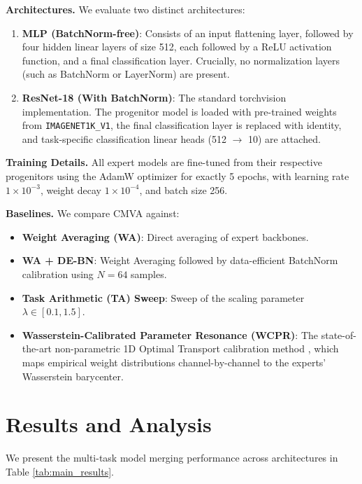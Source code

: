 \documentclass{article}
\theoremstyle{plain}
\theoremstyle{definition}
\theoremstyle{remark}
\begin{document}
\textbf{Architectures.} We evaluate two distinct architectures:
\begin{enumerate}
  \item \textbf{MLP (BatchNorm-free)}: Consists of an input flattening layer, followed by four hidden linear layers of size 512, each followed by a ReLU activation function, and a final classification layer. Crucially, no normalization layers (such as BatchNorm or LayerNorm) are present.
  \item \textbf{ResNet-18 (With BatchNorm)}: The standard torchvision implementation. The progenitor model is loaded with pre-trained weights from \texttt{IMAGENET1K\_V1}, the final classification layer is replaced with identity, and task-specific classification linear heads (512 $\to$ 10) are attached.
\end{enumerate}

\textbf{Training Details.} All expert models are fine-tuned from their respective progenitors using the AdamW optimizer for exactly 5 epochs, with learning rate $1\times 10^{-3}$, weight decay $1\times 10^{-4}$, and batch size 256. 

\textbf{Baselines.} We compare CMVA against:
\begin{itemize}
  \item \textbf{Weight Averaging (WA)}: Direct averaging of expert backbones.
  \item \textbf{WA + DE-BN}: Weight Averaging followed by data-efficient BatchNorm calibration using $N=64$ samples.
  \item \textbf{Task Arithmetic (TA) Sweep}: Sweep of the scaling parameter $\lambda \in [0.1, 1.5]$.
  \item \textbf{Wasserstein-Calibrated Parameter Resonance (WCPR)}: The state-of-the-art non-parametric 1D Optimal Transport calibration method \citep{submission9}, which maps empirical weight distributions channel-by-channel to the experts' Wasserstein barycenter.
\end{itemize}

\section{Results and Analysis}
\label{sec:results}

We present the multi-task model merging performance across architectures in Table \ref{tab:main_results}.
\end{document}
